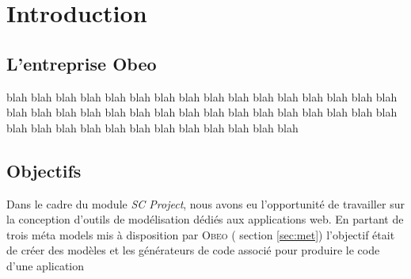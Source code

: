 \chapter{Introduction}\label{chap:Intro}
\section{L'entreprise Obeo}
blah blah blah blah blah blah blah blah blah blah blah blah blah blah blah blah blah blah 
blah blah blah blah blah blah blah blah blah blah blah blah blah blah blah blah blah blah blah blah blah blah blah blah blah blah 
\section{Objectifs}
Dans le cadre du module \emph{SC Project}, nous avons eu l'opportunité de travailler sur la conception d'outils de modélisation dédiés aux applications web. En partant de trois méta models mis à disposition par \textsc{Obeo}
(\cf{} section \ref{sec:met}) l'objectif était de créer des modèles et les générateurs de code associé pour produire le code d'une aplication
